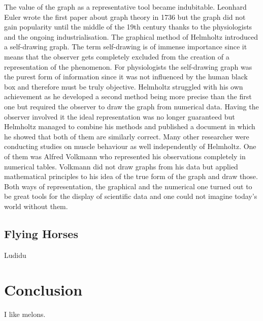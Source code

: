 \documentclass[12pt,a4paper]{article}
\begin{document}
The value of the graph as a representative tool became indubitable. Leonhard Euler wrote the first
paper about graph theory in 1736 \cite{graphtheory} but the graph did not gain popularity until the middle of
the 19th century thanks to the physiologists and the ongoing industrialisation.
The graphical method of Helmholtz introduced a self-drawing graph. The term self-drawing is 
of immense importance since it means that the observer gets completely excluded from the creation
of a representation of the phenomenon. For physiologists the self-drawing graph was the purest form
of information since it was not influenced by the human black box and therefore must be truly objective.
Helmholtz struggled with his own achievement as he developed a second method being more precise than
the first one but required the observer to draw the graph from numerical data.
Having the observer involved it the ideal representation was no longer guaranteed but Helmholtz managed
to combine his methods and published a document in which he showed that both of them are
similarly correct. Many other researcher were conducting studies on muscle behaviour as well independently
of Helmholtz. One of them was Alfred Volkmann who represented his observations completely in numerical
tables. Volkmann did not draw graphs from his data but applied mathematical principles to
his idea of the true form of the graph and draw those. Both ways of representation, the graphical and
the numerical one turned out to be great tools for the display of scientific data and one could not
imagine today's world without them.


\subsection*{Flying Horses}

Ludidu

\section*{Conclusion}

I like melons.


\newpage



\end{document}
